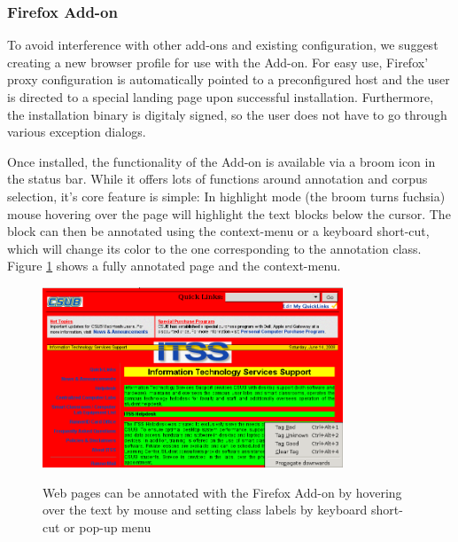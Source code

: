\subsubsection{Firefox Add-on}

To avoid interference with other add-ons and existing configuration, we suggest creating a new browser profile for use with the Add-on.
For easy use, Firefox' proxy configuration is automatically pointed to a preconfigured host and the user is directed to a special landing page upon successful installation.
Furthermore, the installation binary is digitaly signed, so the user does not have to go through various exception dialogs.


Once installed, the functionality of the Add-on is available via a broom icon in the status bar.
While it offers lots of functions around annotation and corpus selection, it's core feature is simple:
In highlight mode (the broom turns fuchsia) mouse hovering over the page will highlight the text blocks below the cursor.
The block can then be annotated using the context-menu or a keyboard short-cut, which will change its color to the one corresponding to the annotation class.
Figure \ref{f:tut0} shows a fully annotated page and the context-menu.

\begin{figure}
	{\includegraphics[width=0.8\textwidth]{tut0}}
\caption{\label{f:tut0}Web pages can be annotated with the {\KrdWrd} Firefox Add-on by hovering over the text by mouse and setting class labels by keyboard short-cut or pop-up menu}
\end{figure}


